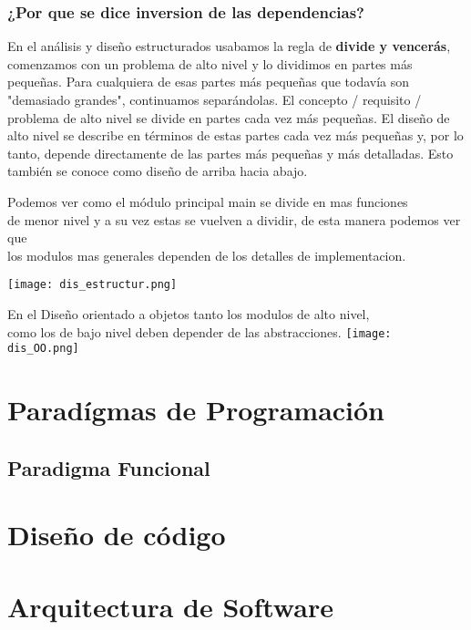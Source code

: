 \documentclass[12pt]{book}
\begin{document}
\subsection{¿Por que se dice inversion de las dependencias?}
En el análisis y diseño estructurados usabamos la regla de \textbf{divide y vencer\'as}, comenzamos con un problema de alto nivel y lo dividimos en partes más pequeñas. Para cualquiera de esas partes más pequeñas que todavía son "demasiado grandes", continuamos separándolas. El concepto / requisito / problema de alto nivel se divide en partes cada vez más pequeñas. El diseño de alto nivel se describe en términos de estas partes cada vez más pequeñas y, por lo tanto, depende directamente de las partes más pequeñas y más detalladas. Esto también se conoce como diseño de arriba hacia abajo.

\begin{center}
Podemos ver como el m\'odulo principal main se divide en mas funciones \\
de menor nivel y a su vez estas se vuelven a dividir, de esta manera podemos ver que\\
los modulos mas generales dependen de los detalles de implementacion.

\texttt{[image: dis\_estructur.png]}
\end{center}

\begin{center}
En el Diseño orientado a objetos tanto los modulos de alto nivel, \\
como los de bajo nivel deben depender de las abstracciones.
\texttt{[image: dis\_OO.png]}
\end{center}



\chapter{Parad\'igmas de Programaci\'on}
\section{Paradigma Funcional}


\chapter{Diseño de código}

\chapter{Arquitectura de Software}
\end{document}
